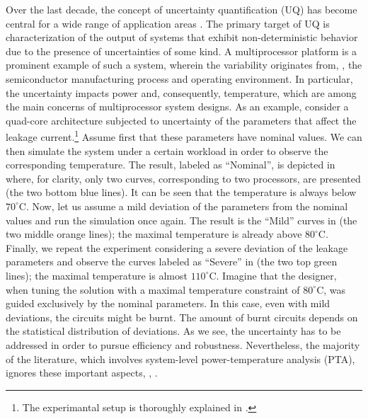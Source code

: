 Over the last decade, the concept of uncertainty quantification (UQ) has become central for a wide range of application areas \cite{xiu2010, eldred2009}. The primary target of UQ is characterization of the output of systems that exhibit non-deterministic behavior due to the presence of uncertainties of some kind. A multiprocessor platform is a prominent example of such a system, wherein the variability originates from, \eg, the semiconductor manufacturing process and operating environment. In particular, the uncertainty impacts power and, consequently, temperature, which are among the main concerns of multiprocessor system designs. As an example, consider a quad-core architecture subjected to uncertainty of the parameters that affect the leakage current.\footnote{The experimantal setup is thoroughly explained in .} Assume first that these parameters have nominal values. We can then simulate the system under a certain workload in order to observe the corresponding temperature. The result, labeled as ``Nominal'', is depicted in  where, for clarity, only two curves, corresponding to two processors, are presented (the two bottom blue lines). It can be seen that the temperature is always below $70^{\circ}$C. Now, let us assume a mild deviation of the parameters from the nominal values and run the simulation once again. The result is the ``Mild'' curves in  (the two middle orange lines); the maximal temperature is already above $80^{\circ}$C. Finally, we repeat the experiment considering a severe deviation of the leakage parameters and observe the curves labeled as ``Severe'' in  (the two top green lines); the maximal temperature is almost $110^{\circ}$C. Imagine that the designer, when tuning the solution with a maximal temperature constraint of $80^\circ$C, was guided exclusively by the nominal parameters. In this case, even with mild deviations, the circuits might be burnt. The amount of burnt circuits depends on the statistical distribution of deviations. As we see, the uncertainty has to be addressed in order to pursue efficiency and robustness. Nevertheless, the majority of the literature, which involves system-level power-temperature analysis (PTA), ignores these important aspects, \eg, \cite{rao2009, rai2011, thiele2011, ukhov2012}.

